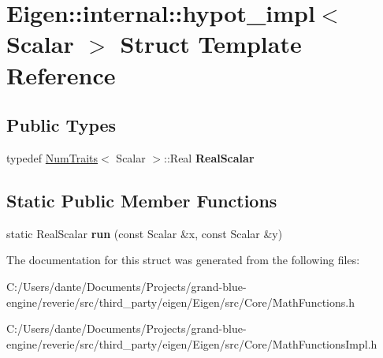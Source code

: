 \hypertarget{struct_eigen_1_1internal_1_1hypot__impl}{}\section{Eigen\+::internal\+::hypot\+\_\+impl$<$ Scalar $>$ Struct Template Reference}
\label{struct_eigen_1_1internal_1_1hypot__impl}
\subsection*{Public Types}
\begin{DoxyCompactItemize}
\item 
\mbox{\label{struct_eigen_1_1internal_1_1hypot__impl_a9e3742421190f0b1322616aefa1320e2}} 
typedef \mbox{\hyperlink{struct_eigen_1_1_num_traits}{Num\+Traits}}$<$ Scalar $>$\+::Real {\bfseries Real\+Scalar}
\end{DoxyCompactItemize}
\subsection*{Static Public Member Functions}
\begin{DoxyCompactItemize}
\item 
\mbox{\label{struct_eigen_1_1internal_1_1hypot__impl_a92d6688858c0aeeee43e25a31556943d}} 
static Real\+Scalar {\bfseries run} (const Scalar \&x, const Scalar \&y)
\end{DoxyCompactItemize}


The documentation for this struct was generated from the following files\+:\begin{DoxyCompactItemize}
\item 
C\+:/\+Users/dante/\+Documents/\+Projects/grand-\/blue-\/engine/reverie/src/third\+\_\+party/eigen/\+Eigen/src/\+Core/Math\+Functions.\+h\item 
C\+:/\+Users/dante/\+Documents/\+Projects/grand-\/blue-\/engine/reverie/src/third\+\_\+party/eigen/\+Eigen/src/\+Core/Math\+Functions\+Impl.\+h\end{DoxyCompactItemize}
